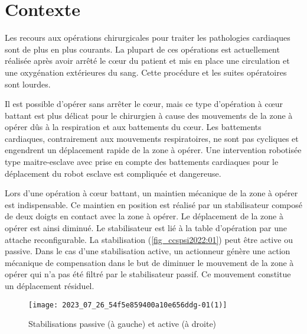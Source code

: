 %
%
%
%
%

\section*{Contexte}
\ifprof
\else
Les recours aux opérations chirurgicales pour traiter les pathologies cardiaques sont de plus en plus courants. La plupart de ces opérations est actuellement réalisée après avoir arrêté le cœur du patient et mis en place une circulation et une oxygénation extérieures du sang. Cette procédure et les suites opératoires sont lourdes.

Il est possible d'opérer sans arrêter le cœur, mais ce type d'opération à cœur battant est plus délicat pour le chirurgien à cause des mouvements de la zone à opérer dûs à la respiration et aux battements du cœur. Les battements cardiaques, contrairement aux mouvements respiratoires, ne sont pas cycliques et engendrent un déplacement rapide de la zone à opérer. Une intervention robotisée type maitre-esclave avec prise en compte des battements cardiaques pour le déplacement du robot esclave est compliquée et dangereuse.

Lors d'une opération à cœur battant, un maintien mécanique de la zone à opérer est indispensable. Ce maintien en position est réalisé par un stabilisateur composé de deux doigts en contact avec la zone à opérer. Le déplacement de la zone à opérer est ainsi diminué. Le stabilisateur est lié à la table d'opération par une attache reconfigurable. La stabilisation (\autoref{fig_ccspsi2022:01}) peut être active ou passive. Dans le cas d'une stabilisation active, un actionneur génère une action mécanique de compensation dans le but de diminuer le mouvement de la zone à opérer qui n'a pas été filtré par le stabilisateur passif. Ce mouvement constitue un déplacement résiduel.
\begin{figure}[!h]
\centering
\texttt{[image: 2023\_07\_26\_54f5e859400a10e656ddg-01(1)]}
\caption{Stabilisations passive (à gauche) et active (à droite) \label{fig_ccspsi2022:01}}
\end{figure}

